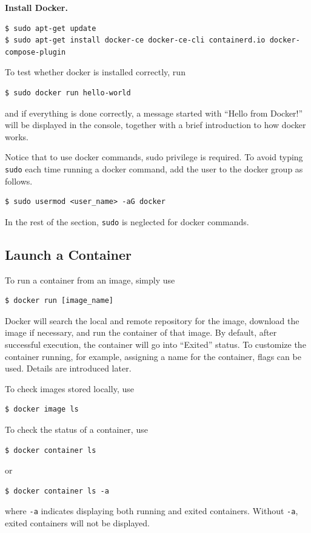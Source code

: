 \vspace{0.1in}
\noindent \textbf{Install Docker.}
\begin{lstlisting}
$ sudo apt-get update
$ sudo apt-get install docker-ce docker-ce-cli containerd.io docker-compose-plugin
\end{lstlisting}

To test whether docker is installed correctly, run
\begin{lstlisting}
$ sudo docker run hello-world
\end{lstlisting}
and if everything is done correctly, a message started with ``Hello from Docker!'' will be displayed in the console, together with a brief introduction to how docker works.

Notice that to use docker commands, sudo privilege is required. To avoid typing \verb|sudo| each time running a docker command, add the user to the docker group as follows.
\begin{lstlisting}
$ sudo usermod <user_name> -aG docker
\end{lstlisting}

In the rest of the section, \verb|sudo| is neglected for docker commands.

\subsection{Launch a Container}

To run a container from an image, simply use
\begin{lstlisting}
$ docker run [image_name]
\end{lstlisting}
Docker will search the local and remote repository for the image, download the image if necessary, and run the container of that image. By default, after successful execution, the container will go into ``Exited'' status. To customize the container running, for example, assigning a name for the container, flags can be used. Details are introduced later.

To check images stored locally, use
\begin{lstlisting}
$ docker image ls
\end{lstlisting}

To check the status of a container, use
\begin{lstlisting}
$ docker container ls
\end{lstlisting}
or
\begin{lstlisting}
$ docker container ls -a
\end{lstlisting}
where \verb|-a| indicates displaying both running and exited containers. Without \verb|-a|, exited containers will not be displayed.

